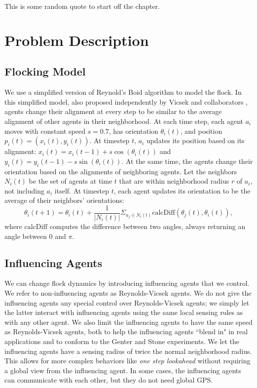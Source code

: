 \begin{savequote}[75mm]
This is some random quote to start off the chapter.
\end{savequote}

\chapter{Problem Description}
\label{ch:problem}

\section{Flocking Model}
We use a simplified version of Reynold's Boid algorithm \cite{reynoldsmodel}
to model the flock.
In this simplified model, also proposed independently by Vicsek and
collaborators \cite{vicsek1995},
agents change their alignment at every step to be similar to the average
alignment of other agents in their neighborhood.
At each time step, each agent $a_i$ moves with constant speed $s=0.7$, has
orientation $\theta_i(t)$, and position $p_i(t) = (x_i(t), y_i(t))$.
At timestep $t$, $a_i$ updates its position based on its alignment:
$x_i(t) = x_i(t-1) + s\cos(\theta_i(t))$ and
$y_i(t) = y_i (t-1) - s\sin(\theta_i(t))$.
At the same time, the agents change their orientation based on the alignments
of neighboring agents.
Let the neighbors $N_i(t)$ be the set of agents at time $t$ that are within
neighborhood radius $r$ of $a_i$, not including $a_i$ itself.
At timestep $t$, each agent updates its orientation to be the average of their
neighbors' orientations:
\[\theta_i(t+1)=\theta_i(t)+\frac{1}{|N_i(t)|} \Sigma_{a_j \in N_i(t)}
\text{calcDiff}(\theta_j(t),\theta_i(t)),\]
where $\text{calcDiff}$ computes the difference between two angles, always
returning an angle between $0$ and $\pi$.

\section{Influencing Agents}
We can change flock dynamics by introducing influencing agents that we control.
We refer to non-influencing agents as Reynolds-Vicsek agents.
We do not give the influencing agents any special control over Reynolds-Vicsek
agents; we simply let the latter interact with influencing agents using the
same local sensing rules as with any other agent.
We also limit the influencing agents to have the same speed as Reynolds-Vicsek
agents, both to help the influencing agents ``blend in" in real applications
and to conform to the Genter and Stone experiments.
We let the influencing agents have a sensing radius of twice the normal
neighborhood radius.
This allows for more complex behaviors like \textit{one step lookahead}
without requiring a global view from the influencing agent.
In some cases, the influencing agents can communicate with each other, but
they do not need global GPS.

